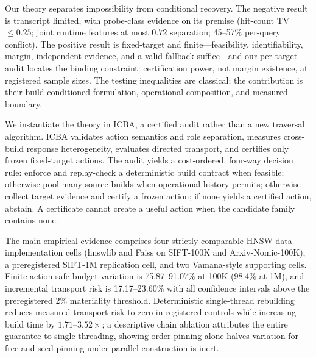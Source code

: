 \documentclass{article}
\begin{document}
Our theory separates impossibility from conditional recovery. The negative result is transcript limited,
with probe-class evidence on its premise (hit-count TV $\le0.25$; joint runtime features at most $0.72$
separation; 45--57\% per-query conflict). The positive result is fixed-target and finite---feasibility,
identifiability, margin, independent evidence, and a valid fallback suffice---and our per-target audit
locates the binding constraint: certification power, not margin existence, at registered sample sizes. The
testing inequalities are classical; the contribution is their build-conditioned formulation, operational
composition, and measured boundary.

We instantiate the theory in ICBA, a certified audit rather than a new traversal algorithm. ICBA validates
action semantics and role separation, measures cross-build response heterogeneity, evaluates directed
transport, and certifies only frozen fixed-target actions. The audit yields a cost-ordered, four-way
decision rule: enforce and replay-check a deterministic build contract when feasible; otherwise pool many
source builds when operational history permits; otherwise collect target evidence and certify a frozen
action; if none yields a certified action, abstain. A certificate cannot create a useful action when the
candidate family contains none.

The main empirical evidence comprises four strictly comparable HNSW data--implementation cells (hnswlib and
Faiss on SIFT-100K and Arxiv-Nomic-100K), a preregistered SIFT-1M replication cell, and two Vamana-style
supporting cells. Finite-action safe-budget variation is 75.87--91.07\% at 100K (98.4\% at 1M), and
incremental transport risk is 17.17--23.60\% with all confidence intervals above the preregistered 2\%
materiality threshold. Deterministic single-thread rebuilding reduces measured transport risk to zero in
registered controls while increasing build time by $1.71$--$3.52\times$; a descriptive chain ablation
attributes the entire guarantee to single-threading, showing order pinning alone halves variation for free
and seed pinning under parallel construction is inert.
\end{document}

